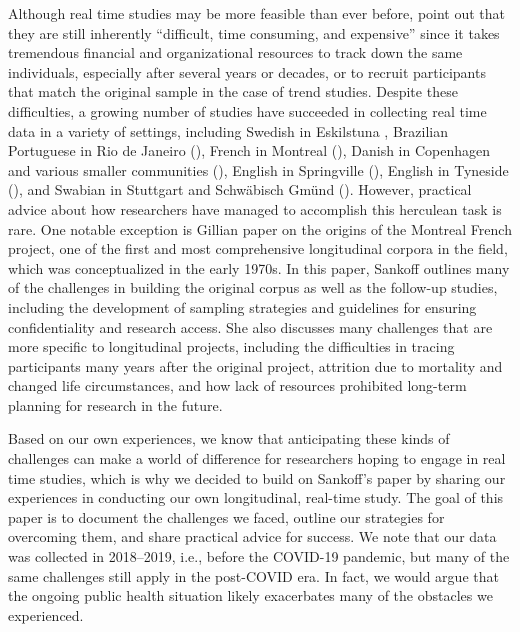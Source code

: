 \documentclass[output=paper]{langscibook}
\begin{document}
Although real time studies may be more feasible than ever before, \citet[53]{CieriCieri2017} point out that they are still inherently ``difficult, time consuming, and expensive'' since it takes tremendous financial and organizational resources to track down the same individuals, especially after several years or decades, or to recruit participants that match the original sample in the case of trend studies. Despite these difficulties, a growing number of studies have succeeded in collecting real time data in a variety of settings, including Swedish in Eskilstuna \citep{Sundgren2001}, Brazilian Portuguese in Rio de Janeiro (\citealt{NaroScherre2003}), French in Montreal (\citealt{SankoffBlondeau2007, WagnerSankoff2011, SankoffWagner2020}), Danish in Copenhagen and various smaller communities (\citealt{Gregersen2009, GregersenEtAl2009}), English in Springville (\citealt{Cukor-AvilaBailey2011, Cukor-AvilaCukor-Avila2017}), English in Tyneside (\citealt{Buchstaller2016, BuchstallerEtAl2017, MechlerBuchstaller2019}), and Swabian in Stuttgart and Schwäbisch Gmünd  (\citealt{Beaman2021a, Beaman2021b, BeamanBaayen2021, BeamanTomaschek2021}). However, practical advice about how researchers have managed to accomplish this herculean task is rare. One notable exception is Gillian  paper on the origins of the Montreal French project, one of the first and most comprehensive longitudinal corpora in the field, which was conceptualized in the early 1970s. In this paper, Sankoff outlines many of the challenges in building the original corpus as well as the follow-up studies, including the development of sampling strategies and guidelines for ensuring confidentiality and research access. She also discusses many challenges that are more specific to longitudinal projects, including the difficulties in tracing participants many years after the original project, attrition due to mortality and changed life circumstances, and how lack of resources prohibited long-term planning for research in the future.


Based on our own experiences, we know that anticipating these kinds of challenges can make a world of difference for researchers hoping to engage in real time studies, which is why we decided to build on Sankoff’s paper by sharing our experiences in conducting our own longitudinal, real-time study. The goal of this paper is to document the challenges we faced, outline our strategies for overcoming them, and share practical advice for success. We note that our data was collected in 2018--2019, i.e., before the COVID-19 pandemic, but many of the same challenges still apply in the post-COVID era. In fact, we would argue that the ongoing public health situation likely exacerbates many of the obstacles we experienced.\\
\end{document}

